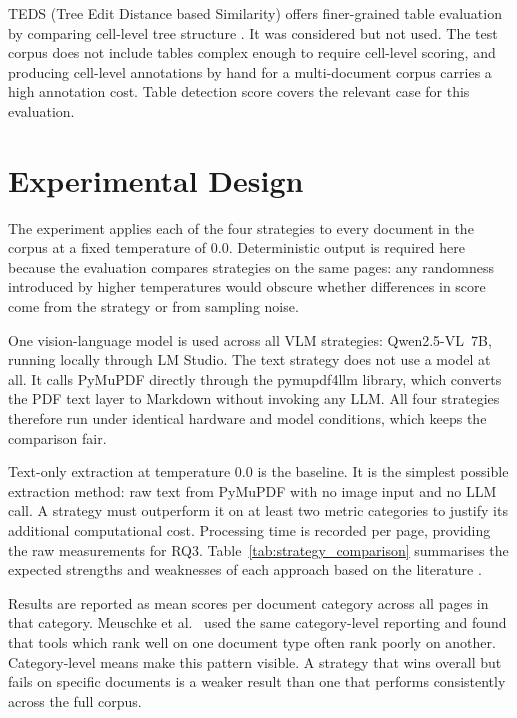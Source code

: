 TEDS (Tree Edit Distance based Similarity) offers finer-grained table
evaluation by comparing cell-level tree structure \autocite{zhong2020}. It was
considered but not used. The test corpus does not include tables complex
enough to require cell-level scoring, and producing cell-level annotations
by hand for a multi-document corpus carries a high annotation cost.
Table detection score covers the relevant case for this evaluation.

\section{Experimental Design}

The experiment applies each of the four strategies to every document in
the corpus at a fixed temperature of 0.0. Deterministic output is
required here because the evaluation compares strategies on the same
pages: any randomness introduced by higher temperatures would obscure
whether differences in score come from the strategy or from sampling
noise.

One vision-language model is used across all VLM strategies:
Qwen2.5-VL~7B, running locally through LM Studio. The text strategy
does not use a model at all. It calls PyMuPDF directly through the
pymupdf4llm library, which converts the PDF text layer to Markdown
without invoking any LLM. All four strategies therefore run under
identical hardware and model conditions, which keeps the comparison fair.

Text-only extraction at temperature 0.0 is the baseline. It is the
simplest possible extraction method: raw text from PyMuPDF with no
image input and no LLM call. A strategy must outperform it on at least
two metric categories to justify its additional computational cost.
Processing time is recorded per page, providing the raw measurements
for RQ3. Table~\ref{tab:strategy_comparison}
summarises the expected strengths and weaknesses of each approach based on
the literature \autocite{meuschke2023, whitington2012}.

Results are reported as mean scores per document category across all pages
in that category. Meuschke et al.\ \autocite{meuschke2023} used the same
category-level reporting and found that tools which rank well on one
document type often rank poorly on another. Category-level means make this
pattern visible. A strategy that wins overall but fails on specific documents is a weaker
result than one that performs consistently across the full corpus.


